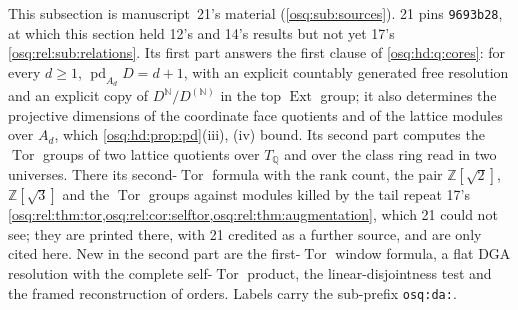 \documentclass[11pt,letterpaper]{article}
\numberwithin{equation}{section}
\theoremstyle{definition}
\theoremstyle{remark}
\theoremstyle{plain}
\newcommand{\Z}{\mathbb Z}
\newcommand{\Q}{\mathbb Q}
\newcommand{\N}{\mathbb N}
\newcommand{\Tor}{\operatorname{Tor}}
\newcommand{\Ext}{\operatorname{Ext}}
\newcommand{\pd}{\operatorname{pd}}
\begin{document}
This subsection is manuscript~21's material (\cref{osq:sub:sources}). 21 pins \texttt{9693b28}, at which this section held 12's and
14's results but not yet 17's \cref{osq:rel:sub:relations}. Its first part answers the first clause of \cref{osq:hd:q:cores}: for every
$d\ge1$, $\pd_{A_d}D=d+1$, with an explicit countably generated free resolution and an explicit copy of $D^{\N}/D^{(\N)}$ in the top
$\Ext$ group; it also determines the projective dimensions of the coordinate face quotients and of the lattice modules over $A_d$, which
\cref{osq:hd:prop:pd}(iii), (iv) bound. Its second part computes the $\Tor$ groups of two lattice quotients over $T_\Q$ and over the class
ring read in two universes. There its second-$\Tor$ formula with the rank count, the pair $\Z[\sqrt2]$, $\Z[\sqrt3]$ and the $\Tor$ groups
against modules killed by the tail repeat 17's \cref{osq:rel:thm:tor,osq:rel:cor:selftor,osq:rel:thm:augmentation}, which 21 could
not see; they are printed there, with 21 credited as a further source, and are only cited here. New in the second part are the
first-$\Tor$ window formula, a flat DGA resolution with the complete self-$\Tor$ product, the linear-disjointness test and the framed
reconstruction of orders. Labels carry the sub-prefix \texttt{osq:da:}.
\end{document}
